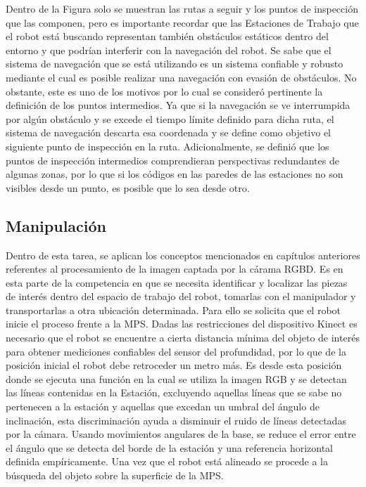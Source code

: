 Dentro de la Figura solo se muestran las rutas a seguir y los puntos de inspección que las componen, pero es importante recordar que las Estaciones de Trabajo que el robot está buscando representan también obstáculos estáticos dentro del entorno y que podrían interferir con la navegación del robot. Se sabe que el sistema de navegación que se está utilizando es un sistema confiable y robusto mediante el cual es posible realizar una navegación con evasión de obstáculos. 
No obstante, este es uno de los motivos por lo cual se consideró pertinente la definición de los puntos intermedios. Ya que si la navegación se ve interrumpida por  algún obstáculo y se excede el tiempo límite definido para dicha ruta, el sistema de navegación descarta esa coordenada y se define como objetivo el siguiente punto de inspección en la ruta. Adicionalmente, se definió que los puntos de inspección intermedios comprendieran perspectivas redundantes de algunas zonas, por lo que si los códigos en las paredes de las estaciones no son visibles desde un punto, es posible que lo sea desde otro.

\subsection{Manipulación}
Dentro de esta tarea, se aplican los conceptos mencionados en capítulos anteriores referentes al procesamiento de la imagen captada por la cárama RGBD.
Es en esta parte de la competencia en que se necesita identificar y localizar las piezas de interés dentro del espacio de trabajo del robot, tomarlas con el manipulador y transportarlas a otra ubicación determinada.
Para ello se solicita que el robot inicie el proceso frente a la MPS. Dadas las restricciones del dispositivo Kinect es necesario que el robot se encuentre a cierta distancia mínima del objeto de interés para obtener mediciones confiables del sensor del profundidad, por lo que de la posición inicial el robot debe retroceder un metro más. Es desde esta posición donde se ejecuta una función en la cual se utiliza la imagen RGB y se detectan las líneas contenidas en la Estación, excluyendo aquellas líneas que se sabe no pertenecen a la estación y aquellas que excedan un umbral del ángulo de inclinación, esta discriminación ayuda a disminuir el ruido de líneas detectadas por la cámara. Usando movimientos angulares de la base, se reduce el error entre el ángulo que se detecta del borde de la estación y una referencia horizontal definida empíricamente. Una vez que el robot está alineado se procede a la búsqueda del objeto sobre la superficie de la MPS.

